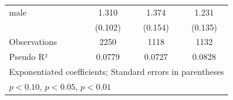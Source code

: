 \begin{table}[htbp]
\begin{tabular}{l*{3}{c}}
\addlinespace
male        &       1.310\sym{***}&       1.374\sym{***}&       1.231\sym{*}  \\
            &     (0.102)         &     (0.154)         &     (0.135)         \\
\midrule
Observations&        2250         &        1118         &        1132         \\
Pseudo R²  &      0.0779         &      0.0727         &      0.0828         \\
\bottomrule
\multicolumn{4}{l}{\footnotesize Exponentiated coefficients; Standard errors in parentheses}\\
\multicolumn{4}{l}{\footnotesize \sym{*} \(p<0.10\), \sym{**} \(p<0.05\), \sym{***} \(p<0.01\)}\\
\end{tabular}
\end{table}
